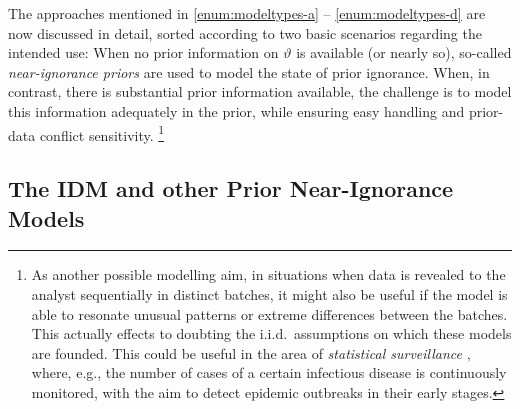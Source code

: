 The approaches mentioned in \eqref{enum:modeltypes-a} -- \eqref{enum:modeltypes-d} are now discussed in detail,
sorted according to two basic scenarios regarding the intended use:
When no prior information on $\vartheta$ is available (or nearly so),
so-called \emph{near-ignorance priors} are used to model the state of prior ignorance.
When, in contrast, there is substantial prior information available,
the challenge is to model this information adequately in the prior,
while ensuring easy handling and prior-data conflict sensitivity.%
\footnote{\label{foot:sequential}As another possible modelling aim,
in situations when data is revealed to the analyst sequentially in distinct batches,
it might also be useful if the model is able to resonate unusual patterns or extreme differences between the batches.
This actually effects to doubting the i.i.d.\ assumptions on which these models are founded.
This could be useful in the area of \emph{statistical surveillance} \parencite[see, e.g.,][]{2011:IESS-surveillance},
where, e.g., the number of cases of a certain infectious disease is continuously monitored,
with the aim to detect epidemic outbreaks in their early stages.}


\subsection{The IDM and other Prior Near-Ignorance Models}
\label{sec:idm-and-near-ignorance}

